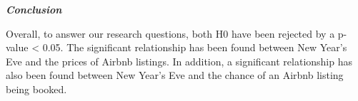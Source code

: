 \documentclass[
]{article}
\begin{document}
\textbf{\emph{Conclusion}}

Overall, to answer our research questions, both H0 have been rejected by
a p-value \textless{} 0.05. The significant relationship has been found
between New Year's Eve and the prices of Airbnb listings. In addition, a
significant relationship has also been found between New Year's Eve and
the chance of an Airbnb listing being booked.
\end{document}
